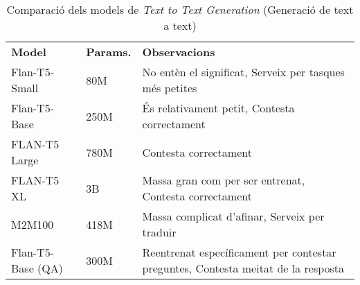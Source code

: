 \begin{table}[H]
    \centering
    \begin{tabular}{|>{\centering}m{2.3cm}|m{1.6cm}|m{10.7cm}|}
        \hline
        \multicolumn{3}{|c|}{\textbf{Models de \textit{Text to Text Generation}}} \\
        \hline
        \textbf{Model} & \textbf{Params.} & \textbf{Observacions} \\
        \hline
        Flan-T5-Small & 80M & No entèn el significat, Serveix per tasques més petites \\
        Flan-T5-Base & 250M & És relativament petit, Contesta correctament \\
        FLAN-T5 Large & 780M & Contesta correctament \\
        FLAN-T5 XL & 3B & Massa gran com per ser entrenat, Contesta correctament \\
        M2M100 & 418M & Massa complicat d'afinar, Serveix per traduir \\
        Flan-T5-Base (QA) & 300M & Reentrenat específicament per contestar preguntes, Contesta meitat de la resposta  \\
        \hline
    \end{tabular}
    \caption{Comparació dels models de \textit{Text to Text Generation} (Generació de text a text)}
    \label{tab:t2t-comparison}
\end{table}